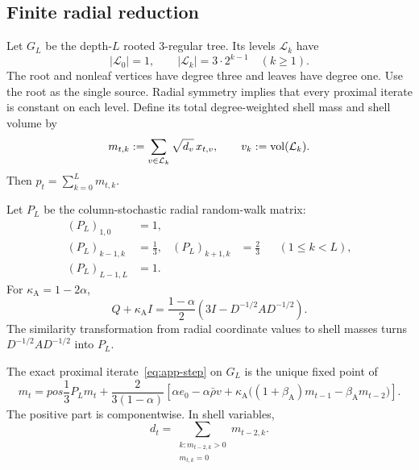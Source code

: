 \label{sec:tree-wave}
\subsection{Finite radial reduction}

Let $G_L$ be the depth-$L$ rooted $3$-regular tree.  Its levels
$\mathcal L_k$ have
\[
 |\mathcal L_0|=1,
 \qquad
 |\mathcal L_k|=3\cdot2^{k-1}\quad(k\ge1).
\]
The root and nonleaf vertices have degree three and leaves have degree one.
Use the root as the single source.  Radial symmetry implies that every
proximal iterate is constant on each level.  Define its total
degree-weighted shell mass and shell volume by
\begin{equation}
 m_{t,k}:=\sum_{v\in\mathcal L_k}\sqrt{d_v}\,x_{t,v},
 \qquad
 v_k:=\operatorname{vol}(\mathcal L_k).
 \label{eq:shell-mass}
\end{equation}
Then $p_t=\sum_{k=0}^Lm_{t,k}$.

Let $P_L$ be the column-stochastic radial random-walk matrix:
\begin{align*}
 (P_L)_{1,0}&=1,\\
 (P_L)_{k-1,k}&=\frac13,
 & (P_L)_{k+1,k}&=\frac23
 &&(1\le k<L),\\
 (P_L)_{L-1,L}&=1.
\end{align*}
For $\kappa_{\mathrm A}=1-2\alpha$,
\begin{equation}
 Q+\kappa_{\mathrm A} I
 =\frac{1-\alpha}{2}
  \left(3I-D^{-1/2}AD^{-1/2}\right).
 \label{eq:tree-prox-hessian}
\end{equation}
The similarity transformation from radial coordinate values to shell masses
turns $D^{-1/2}AD^{-1/2}$ into $P_L$.

\begin{proposition}
\label{prop:radial-recurrence}
The exact proximal iterate~\eqref{eq:app-step} on $G_L$ is the unique fixed
point of
\begin{equation}
 m_t=pos{
   \frac13P_Lm_t
   +\frac{2}{3(1-\alpha)}
    \left[
      \alpha e_0-\alpha\bar\rho v
      +\kappa_{\mathrm A}\bigl((1+\beta_{\mathrm A})m_{t-1}-\beta_{\mathrm A} m_{t-2}\bigr)
    \right]
 }.
 \label{eq:radial-obstacle}
\end{equation}
The positive part is componentwise.  In shell variables,
\begin{equation}
 d_t
 =\sum_{\substack{k:m_{t-2,k}>0\\m_{t,k}=0}}m_{t-2,k}.
 \label{eq:radial-dropout}
\end{equation}
\end{proposition}


